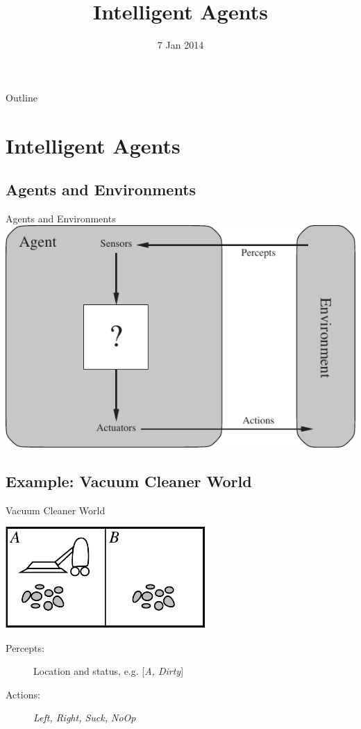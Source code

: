 \documentclass[14pt]{beamer}
\title{Intelligent Agents}
\date[]{7 Jan 2014}
\begin{document}
\begin{frame}
  \titlepage
\end{frame}

\begin{frame}{Outline}
  \tableofcontents
\end{frame}

\section{Intelligent Agents}
\subsection{Agents and Environments}

\begin{frame}{Agents and Environments}
	\includegraphics[width=\textwidth]{agent-environment.pdf}
\end{frame}

\subsection{Example: Vacuum Cleaner World}

\begin{frame}{Vacuum Cleaner World}
	\begin{center}
		\includegraphics[width=3in]{vacuum-environment.pdf}
	\end{center}
	\begin{description}
		\item[Percepts:] Location and status, e.g. [\textit{A, Dirty}]
		\item[Actions:] \textit{Left, Right, Suck, NoOp}
	\end{description}
\end{frame}
\end{document}

